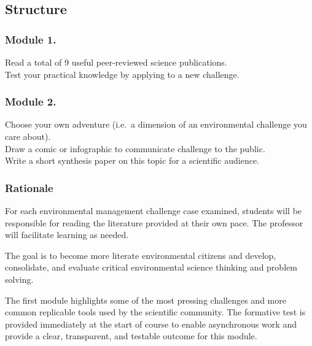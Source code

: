 \documentclass[
]{book}
\begin{document}
\hypertarget{structure}{%
\subsection*{Structure}\label{structure}}

\hypertarget{module-1.}{%
\subsubsection*{Module 1.}\label{module-1.}}

Read a total of 9 useful peer-reviewed science publications.\\
Test your practical knowledge by applying to a new challenge.

\hypertarget{module-2.}{%
\subsubsection*{Module 2.}\label{module-2.}}

Choose your own adventure (i.e.~a dimension of an environmental challenge you care about).\\
Draw a comic or infographic to communicate challenge to the public.\\
Write a short synthesis paper on this topic for a scientific audience.

\hypertarget{rationale}{%
\subsubsection*{Rationale}\label{rationale}}

For each environmental management challenge case examined, students will be responsible for reading the literature provided at their own pace. The professor will facilitate learning as needed.

The goal is to become more literate environmental citizens and develop, consolidate, and evaluate critical environmental science thinking and problem solving.

The first module highlights some of the most pressing challenges and more common replicable tools used by the scientific community. The formative test is provided immediately at the start of course to enable asynchronous work and provide a clear, transparent, and testable outcome for this module.
\end{document}
